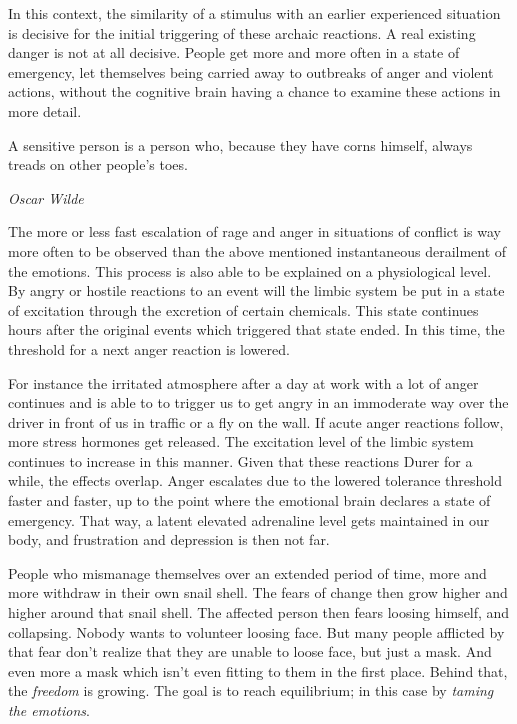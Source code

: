 \documentclass[../main.tex]{subfiles}
\begin{document}
In this context, the similarity of a stimulus with an earlier experienced situation is decisive for the initial triggering of these archaic reactions.
A real existing danger is not at all decisive.
People get more and more often in a state of emergency, let themselves being carried away to outbreaks of anger and violent actions,
without the cognitive brain having a chance to examine these actions in more detail.

\epigraph{A sensitive person is a person who, because they have corns himself, always treads on other people's toes.}{\textit{Oscar Wilde}}

The more or less fast escalation of rage and anger in situations of conflict is way more often to be observed  than the above mentioned instantaneous derailment of the emotions.
This process is also able to be explained on a physiological level.
By angry or hostile reactions to an event will the limbic system be put in a state of excitation through the excretion of certain chemicals.
This state continues hours after the original events which triggered that state ended.
In this time, the threshold for a next anger reaction is lowered.

For instance the irritated atmosphere after a day at work with a lot of anger continues and is able to to trigger us to get angry in an immoderate way
over the driver in front of us in traffic or a fly on the wall.
If acute anger reactions follow, more stress hormones get released.
The excitation level of the limbic system continues to increase in this manner.
Given that these reactions Durer for a while, the effects overlap.
Anger escalates due to the lowered tolerance threshold faster and faster, up to the point where the emotional brain declares a state of emergency.
That way, a latent elevated adrenaline level gets maintained in our body, and frustration and depression is then not far.

People who mismanage themselves over an extended period of time, more and more withdraw in their own snail shell.
The fears of change then grow higher and higher around that snail shell.
The affected person then fears loosing himself, and collapsing.
Nobody wants to volunteer loosing face.
But many people afflicted by that fear don't realize that they are unable to loose face, but just a mask.
And even more a mask which isn't even fitting to them in the first place.
Behind that, the \emph{freedom} is growing.
The goal is to reach equilibrium; in this case by \emph{taming the emotions}.
\end{document}
